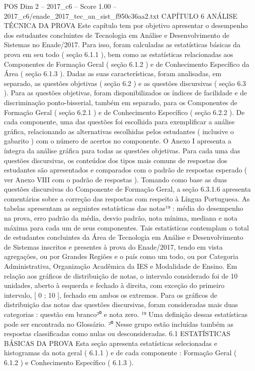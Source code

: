 \begin{textsample}{POS Dim 2 – 2017\_c6 – Score 1.00 – 2017\_c6/enade\_2017\_tec\_an\_sist\_f950c36aa2.txt}  \label{ex:f2_pos_268}
CAPÍTULO 6 ANÁLISE TÉCNICA DA PROVA Este capítulo tem por objetivo apresentar o desempenho dos estudantes concluintes de Tecnologia em Análise e Desenvolvimento de Sistemas no Enade/2017.
Para isso, foram calculadas as estatísticas básicas da prova em seu todo ( seção 6.1.1 ), bem como as estatísticas relacionadas aos Componentes de Formação Geral ( seção 6.1.2 ) e de Conhecimento Específico da Área ( seção 6.1.3 ).
Dadas as suas características, foram analisadas, em separado, as questões objetivas ( seção 6.2 ) e as questões discursivas ( seção 6.3 ).
Para as questões objetivas, foram disponibilizados os índices de facilidade e de discriminação ponto-bisserial, também em separado, para os Componentes de Formação Geral ( seção 6.2.1 ) e de Conhecimento Específico ( seção 6.2.2 ).
De cada componente, uma das questões foi escolhida para exemplificar a análise gráfica, relacionando as alternativas escolhidas pelos estudantes ( inclusive o gabarito ) com o número de acertos no componente.
O Anexo I apresenta a íntegra da análise gráfica para todas as questões objetivas.
Para cada uma das questões discursivas, os conteúdos dos tipos mais comuns de respostas dos estudantes são apresentados e comparados com o padrão de respostas esperado ( ver Anexo VIII com o padrão de respostas ).
Tomando como base as duas questões discursivas do Componente de Formação Geral, a seção 6.3.1.6 apresenta comentários sobre a correção das respostas com respeito à Língua Portuguesa.
As tabelas apresentam as seguintes estatísticas das notas¹⁹ : média do desempenho na prova, erro padrão da média, desvio padrão, nota mínima, mediana e nota máxima para cada um de seus componentes.
Tais estatísticas contemplam o total de estudantes concluintes da Área de Tecnologia em Análise e Desenvolvimento de Sistemas inscritos e presentes à prova do Enade/2017, tendo em vista agregações, ou por Grandes Regiões e o país como um todo, ou por Categoria Administrativa, Organização Acadêmica da IES e Modalidade de Ensino.
Em relação aos gráficos de distribuição de notas, o intervalo considerado foi de 10 unidades, aberto à esquerda e fechado à direita, com exceção do primeiro intervalo, [ 0 ; 10 ], fechado em ambos os extremos.
Para os gráficos de distribuição das notas das questões discursivas, foram consideradas mais duas categorias : questão em branco²⁰ e nota zero. ¹⁹ Uma definição dessas estatísticas pode ser encontrada no Glossário. ²⁰ Nesse grupo estão incluídas também as respostas classificadas como nulas ou desconsideradas. 6.1 ESTATÍSTICAS BÁSICAS DA PROVA Esta seção apresenta estatísticas selecionadas e histogramas da nota geral ( 6.1.1 ) e de cada componente : Formação Geral ( 6.1.2 ) e Conhecimento Específico ( 6.1.3 ).

\end{textsample}
